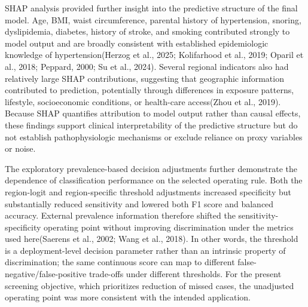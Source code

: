 \documentclass[10pt]{article}
\begin{document}
SHAP analysis provided further insight into the predictive structure of
the final model. Age, BMI, waist circumference, parental history of
hypertension, snoring, dyslipidemia, diabetes, history of stroke, and
smoking contributed strongly to model output and are broadly consistent
with established epidemiologic knowledge of hypertension(Herzog et al.,
2025; Kolifarhood et al., 2019; Oparil et al., 2018; Peppard, 2000; Su
et al., 2024). Several regional indicators also had relatively large
SHAP contributions, suggesting that geographic information contributed
to prediction, potentially through differences in exposure patterns,
lifestyle, socioeconomic conditions, or health-care access(Zhou et al.,
2019). Because SHAP quantifies attribution to model output rather than
causal effects, these findings support clinical interpretability of the
predictive structure but do not establish pathophysiologic mechanisms or
exclude reliance on proxy variables or noise.

The exploratory prevalence-based decision adjustments further
demonstrate the dependence of classification performance on the selected
operating rule. Both the region-logit and region-specific threshold
adjustments increased specificity but substantially reduced sensitivity
and lowered both F1 score and balanced accuracy. External prevalence
information therefore shifted the sensitivity-specificity operating
point without improving discrimination under the metrics used
here(Saerens et al., 2002; Wang et al., 2018). In other words, the
threshold is a deployment-level decision parameter rather than an
intrinsic property of discrimination; the same continuous score can map
to different false-negative/false-positive trade-offs under different
thresholds. For the present screening objective, which prioritizes
reduction of missed cases, the unadjusted operating point was more
consistent with the intended application.
\end{document}
